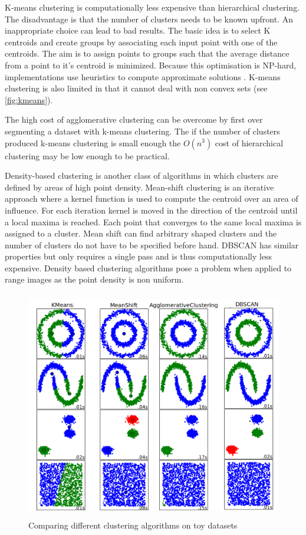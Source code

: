 

K-means clustering is computationally less expensive than hierarchical clustering. The disadvantage is that the number of clusters needs to be known upfront. An inappropriate choice can lead to bad results. The basic idea is to select K centroids and create groups by associating each input point with one of the centroids. The aim is to assign points to groups such that the average distance from a point to it's centroid is minimized. Because this optimisation is NP-hard, implementations use heuristics to compute approximate solutions \cite{Ponce2012}. K-means clustering is also limited in that it cannot deal with non convex sets (see \autoref{fig:kmeans}).

The high cost of agglomerative clustering can be overcome by first over segmenting a dataset with k-means clustering. The if the number of clusters produced k-means clustering is small enough the $O(n^3)$ cost of hierarchical clustering may be low enough to be practical.


Density-based clustering is another class of algorithms in which clusters are defined by areas of high point density. Mean-shift clustering \cite{Comaniciu2002} is an iterative approach where a kernel function is used to compute the centroid over an area of influence. For each iteration kernel is moved in the direction of the centroid until a local maxima is reached. Each point that converges to the same local maxima is assigned to a cluster. Mean shift can find arbitrary shaped clusters and the number of clusters do not have to be specified before hand. DBSCAN \cite{Ester1996} has similar properties but only requires a single pass and is thus computationally less expensive. Density based clustering algorithms pose a problem when applied to range images as the point density is non uniform. 


\begin{figure}
\centering
\includegraphics[height=10cm]{images/cluster-comparison}
\caption[Clustering algorithms]{Comparing different clustering algorithms on toy datasets \protect\footnotemark}\label{fig:compareclustering}
\end{figure}

